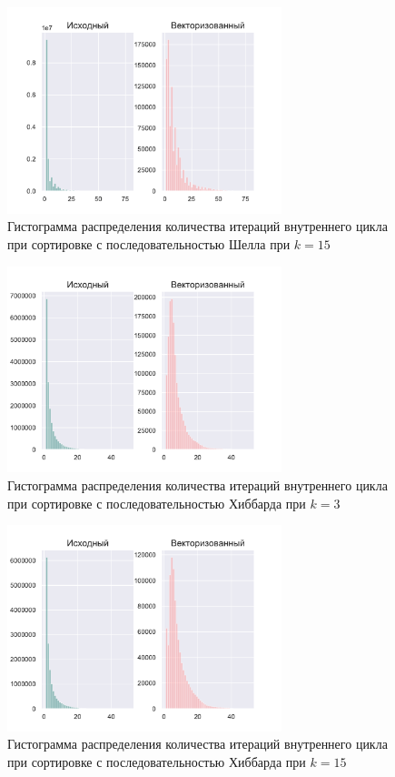 \documentclass[utf8]{psta}
\begin{document}
\begin{figure}
\includegraphics[width=8cm,height=6cm]{pics/pic_shell_k_15}
\caption{Гистограмма распределения количества итераций внутреннего цикла при сортировке с последовательностью Шелла при $k = 15$}
\label{pic:shell_k_15}
\end{figure}

\begin{figure}
\includegraphics[width=8cm,height=6cm]{pics/pic_hibbard_k_3}
\caption{Гистограмма распределения количества итераций внутреннего цикла при сортировке с последовательностью Хиббарда при $k = 3$}
\label{pic:hibbard_k_3}
\end{figure}

\begin{figure}
\includegraphics[width=8cm,height=6cm]{pics/pic_hibbard_k_15}
\caption{Гистограмма распределения количества итераций внутреннего цикла при сортировке с последовательностью Хиббарда при $k = 15$}
\label{pic:hibbard_k_15}
\end{figure}
\end{document}
